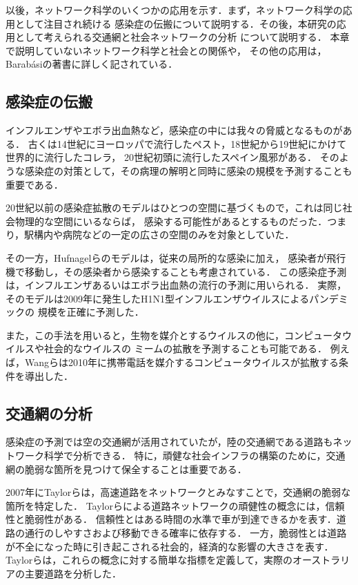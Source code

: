 以後，ネットワーク科学のいくつかの応用を示す．まず，ネットワーク科学の応用として注目され続ける
感染症の伝搬について説明する．その後，本研究の応用として考えられる交通網と社会ネットワークの分析
について説明する．
本章で説明していないネットワーク科学と社会との関係や，
その他の応用は，Barab{\'{a}}siの著書\cite{Barabasi2016}に詳しく記されている．

\subsection{感染症の伝搬}

インフルエンザやエボラ出血熱など，感染症の中には我々の脅威となるものがある．
古くは14世紀にヨーロッパで流行したペスト，18世紀から19世紀にかけて世界的に流行したコレラ，
20世紀初頭に流行したスペイン風邪がある．
そのような感染症の対策として，その病理の解明と同時に感染の規模を予測することも重要である．

20世紀以前の感染症拡散のモデルはひとつの空間に基づくもので，これは同じ社会物理的な空間にいるならば，
感染する可能性があるとするものだった．つまり，駅構内や病院などの一定の広さの空間のみを対象としていた．

その一方，Hufnagelらのモデル\cite{Hufnagel2004}は，従来の局所的な感染に加え，
感染者が飛行機で移動し，その感染者から感染することも考慮されている．
この感染症予測は，インフルエンザあるいはエボラ出血熱の流行の予測に用いられる．
実際，そのモデルは2009年に発生したH1N1型インフルエンザウイルスによるパンデミックの
規模を正確に予測した\cite{Balcan2009}．

また，この手法を用いると，生物を媒介とするウイルスの他に，コンピュータウイルスや社会的なウイルスの
ミームの拡散を予測することも可能である．
例えば，Wangらは2010年に携帯電話を媒介するコンピュータウイルスが拡散する条件を導出した\cite{Wang2009}．

\subsection{交通網の分析}

感染症の予測では空の交通網が活用されていたが，陸の交通網である道路もネットワーク科学で分析できる．
特に，頑健な社会インフラの構築のために，交通網の脆弱な箇所を見つけて保全することは重要である．

2007年にTaylorらは，高速道路をネットワークとみなすことで，交通網の脆弱な箇所を特定した\cite{Taylor2007}．
Taylorらによる道路ネットワークの頑健性の概念には，信頼性と脆弱性がある．
信頼性とはある時間の水準で車が到達できるかを表す．道路の通行のしやすさおよび移動できる確率に依存する．
一方，脆弱性とは道路が不全になった時に引き起こされる社会的，経済的な影響の大きさを表す．
Taylorらは，これらの概念に対する簡単な指標を定義して，実際のオーストラリアの主要道路を分析した．

